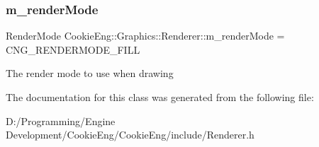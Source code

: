 \subsubsection{\texorpdfstring{m\+\_\+render\+Mode}{m\_renderMode}}
{\footnotesize\ttfamily Render\+Mode Cookie\+Eng\+::\+Graphics\+::\+Renderer\+::m\+\_\+render\+Mode = C\+N\+G\+\_\+\+R\+E\+N\+D\+E\+R\+M\+O\+D\+E\+\_\+\+F\+I\+LL\hspace{0.3cm}{\ttfamily [protected]}}

The render mode to use when drawing 

The documentation for this class was generated from the following file\+:\begin{DoxyCompactItemize}
\item 
D\+:/\+Programming/\+Engine Development/\+Cookie\+Eng/\+Cookie\+Eng/include/Renderer.\+h\end{DoxyCompactItemize}
